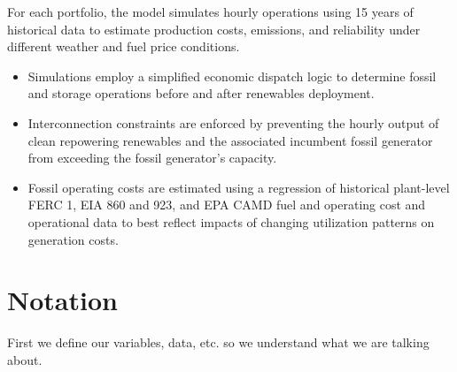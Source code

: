 \documentclass[9pt, oneside]{article}
\numberwithin{equation}{subsubsection}
\begin{document}
For each portfolio, the model simulates hourly operations using 15 years of historical data
to estimate production costs, emissions, and reliability under different weather
and fuel price conditions.
\begin{itemize}
	\item Simulations employ a simplified economic dispatch logic to determine fossil and
	      storage operations before and after renewables deployment.
	\item Interconnection constraints are enforced by preventing the hourly output of clean
	      repowering renewables and the associated incumbent fossil generator from exceeding the
	      fossil generator's capacity.
	\item Fossil operating costs are estimated using a regression of historical plant-level
	      FERC 1, EIA 860 and 923, and EPA CAMD fuel and operating cost and operational data to
	      best reflect impacts of changing utilization patterns on generation costs.
\end{itemize}

\section{Notation}\label{sec:notation}
First we define our variables, data, etc. so we understand what we are
talking about.
\end{document}
